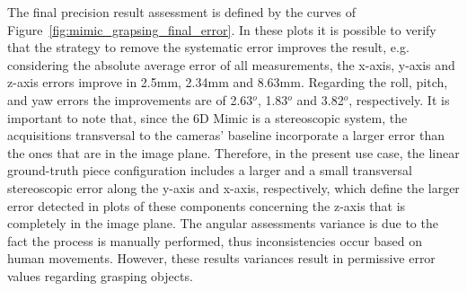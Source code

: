 The final precision result assessment is defined by the curves of Figure~\ref{fig:mimic_grapsing_final_error}. In these plots it is possible to verify that the strategy to remove the systematic error improves the result, e.g. considering the absolute average error of all measurements, the x-axis, y-axis and z-axis errors improve in 2.5mm, 2.34mm and 8.63mm. Regarding the roll, pitch, and yaw errors the improvements are of 2.63$^o$, 1.83$^o$ and 3.82$^o$, respectively. It is important to note that, since the 6D Mimic is a stereoscopic system, the acquisitions transversal to the cameras' baseline incorporate a larger error than the ones that are in the image plane. Therefore, in the present use case,  the linear ground-truth piece configuration includes a larger and a small transversal stereoscopic error along the y-axis and x-axis, respectively, which define the larger error detected in plots of these components concerning the z-axis that is completely in the image plane. The angular assessments variance is due to the fact the process is manually performed, thus inconsistencies occur based on human movements. However, these results variances result in permissive error values regarding grasping objects.

